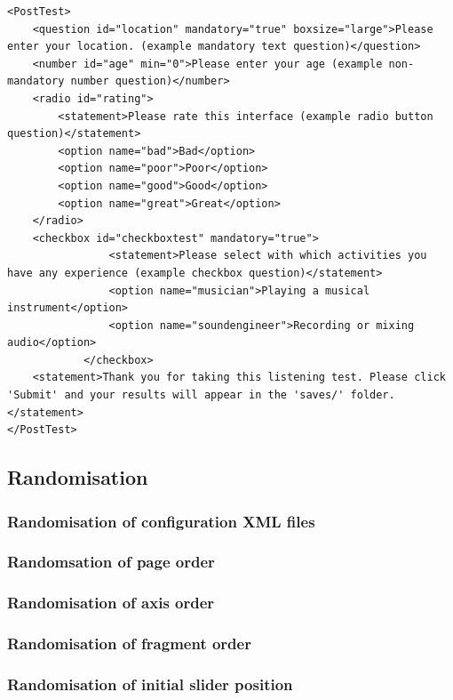 \documentclass[11pt, oneside]{article}   	%
\begin{document}
			\begin{lstlisting}
<PostTest>
	<question id="location" mandatory="true" boxsize="large">Please enter your location. (example mandatory text question)</question>
	<number id="age" min="0">Please enter your age (example non-mandatory number question)</number>
	<radio id="rating">
		<statement>Please rate this interface (example radio button question)</statement>
		<option name="bad">Bad</option>
		<option name="poor">Poor</option>
		<option name="good">Good</option>
		<option name="great">Great</option>
	</radio>
	<checkbox id="checkboxtest" mandatory="true">
				<statement>Please select with which activities you have any experience (example checkbox question)</statement>
				<option name="musician">Playing a musical instrument</option>
				<option name="soundengineer">Recording or mixing audio</option>
			</checkbox>
	<statement>Thank you for taking this listening test. Please click 'Submit' and your results will appear in the 'saves/' folder.</statement>
</PostTest>
			\end{lstlisting}


	\subsection{Randomisation}

		\subsubsection{Randomisation of configuration XML files}


		\subsubsection{Randomsation of page order}


		\subsubsection{Randomisation of axis order}

		\subsubsection{Randomisation of fragment order}


		\subsubsection{Randomisation of initial slider position}
\end{document}
